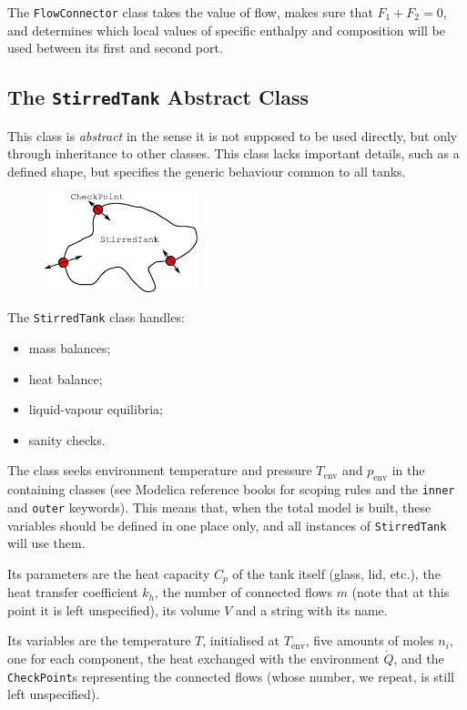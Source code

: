 \documentclass[a4paper]{article}
\begin{document}
The \texttt{FlowConnector} class takes the value of flow, makes sure that $F_1
+F_2=0$, and determines which local values of specific enthalpy and
composition will be used between its first and second port.


\subsection{The \texttt{StirredTank} Abstract Class}
This class is \emph{abstract} in the sense it is not supposed to be used
directly, but only through inheritance to other classes. This class lacks
important details, such as a defined shape, but specifies the generic behaviour
common to all tanks.

\begin{figure}[h]
\centering
\includegraphics[width=0.4\textwidth]{pics/stirredtank}
\end{figure}

The \texttt{StirredTank} class handles:
\begin{itemize}
\item mass balances;
\item heat balance;
\item liquid-vapour equilibria;
\item sanity checks.
\end{itemize}

The class seeks environment temperature and pressure $T_\text{env}$ and
$p_\text{env}$ in the containing classes (see Modelica reference books for
scoping rules and the \texttt{inner} and \texttt{outer} keywords). This means
that, when the total model is built, these variables should be defined in one
place only, and all instances of \texttt{StirredTank} will use them.

Its parameters are the heat capacity $C_p$ of the tank itself (glass, lid,
etc.), the heat transfer coefficient $k_h$, the number of connected flows $m$
(note that at this point it is left unspecified), its volume $V$ and a string
with its name.

Its variables are the temperature $T$, initialised at $T_\text{env}$, five
amounts of moles $n_i$, one for each component, the heat exchanged with the
environment $\dot Q$, and the \texttt{CheckPoint}s representing the connected
flows (whose number, we repeat, is still left unspecified).
\end{document}
